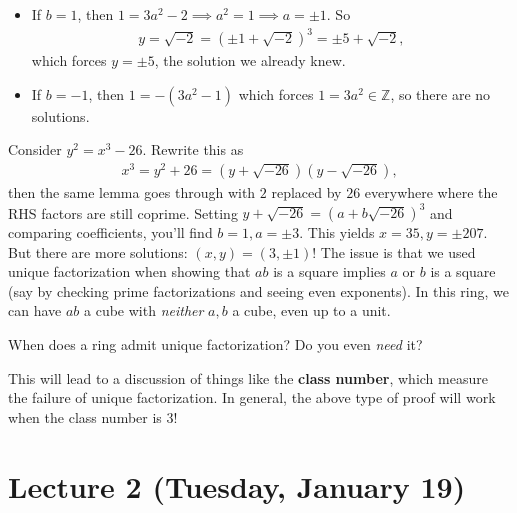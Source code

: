\begin{example}[Fermat]
\begin{itemize}
\item
  If \(b=1\), then \(1 = 3a^2 -2 \implies a^2 = 1 \implies a = \pm 1\).
  So
  \begin{align*}
  y = \sqrt{-2} = (\pm 1 + \sqrt{-2} )^3 = \pm 5 + \sqrt{-2}
  ,\end{align*}
  which forces \(y=\pm 5\), the solution we already knew.
\item
  If \(b = -1\), then \(1 = -(3a^2 - 1)\) which forces
  \(1=3a^2 \in {\mathbb{Z}}\), so there are no solutions.
\end{itemize}

\end{example}

\begin{example}[?]

Consider \(y^2 = x^3 - 26\). Rewrite this as
\begin{align*}
x^3 = y^2 + 26 = (y + \sqrt{-26} )(y - \sqrt{-26} )
,\end{align*}
then the same lemma goes through with \(2\) replaced by \(26\)
everywhere where the RHS factors are still coprime. Setting
\(y + \sqrt{-26} = (a + b \sqrt{-26} )^3\) and comparing coefficients,
you'll find \(b=1, a = \pm 3\). This yields \(x=35, y=\pm 207\). But
there are more solutions: \((x, y) = (3, \pm 1)\)! The issue is that we
used unique factorization when showing that \(ab\) is a square implies
\(a\) or \(b\) is a square (say by checking prime factorizations and
seeing even exponents). In this ring, we can have \(ab\) a cube with
\emph{neither} \(a,b\) a cube, even up to a unit.

\end{example}

\begin{question}

When does a ring admit unique factorization? Do you even \emph{need} it?

\end{question}

This will lead to a discussion of things like the \textbf{class number},
which measure the failure of unique factorization. In general, the above
type of proof will work when the class number is 3!

\hypertarget{lecture-2-tuesday-january-19}{%
\section{Lecture 2 (Tuesday, January
19)}\label{lecture-2-tuesday-january-19}}

